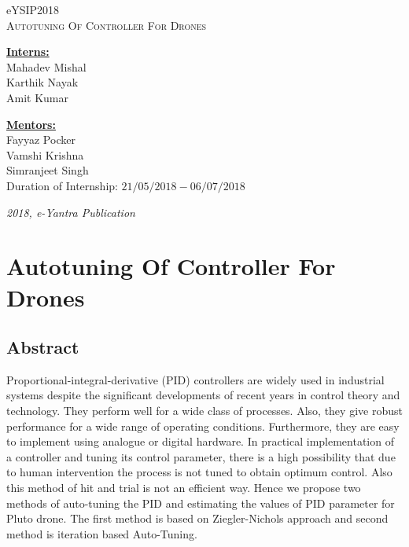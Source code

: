 \documentclass[a4paper,12pt,oneside]{book}
\begin{document}
\begin{titlepage}
\raggedright
{\Large eYSIP2018\\[1cm]}
{\Huge\scshape Autotuning Of Controller For Drones\\[.1in]}
\vfill
\begin{flushright}
{\large{\textbf{\underline{Interns:}}}}\\
{\large Mahadev Mishal \\}
{\large Karthik Nayak \\}
{\large Amit Kumar \\}
\end{flushright}

\begin{flushright}
{\large{\textbf{\underline{Mentors:}}}}\\
{\large{Fayyaz Pocker\\}}
{\large{Vamshi Krishna\\}}
{\large{Simranjeet Singh\\}}
{\large Duration of Internship: $ 21/05/2018-06/07/2018 $ \\}
\end{flushright}

{\itshape 2018, e-Yantra Publication}
\end{titlepage}

\setcounter{tocdepth}{2}
\tableofcontents 
\cleardoublepage
\pagebreak
\chapter{Autotuning Of Controller For Drones}

\section{Abstract}
Proportional-integral-derivative (PID) controllers are widely used in industrial systems despite the
significant developments of recent years in control theory and technology. They perform well for a wide class of processes. Also, they give robust performance for a wide range of operating conditions. Furthermore, they are easy to implement using analogue or digital hardware. In practical implementation of a controller and tuning its control parameter, there is a high
possibility that due to human intervention the process is not tuned to obtain optimum control. Also this method of hit and trial is not an efficient way. Hence we propose two methods of auto-tuning the PID and estimating the values of PID parameter for Pluto drone. The first method is based on Ziegler-Nichols approach and second method is iteration based Auto-Tuning.
\end{document}
